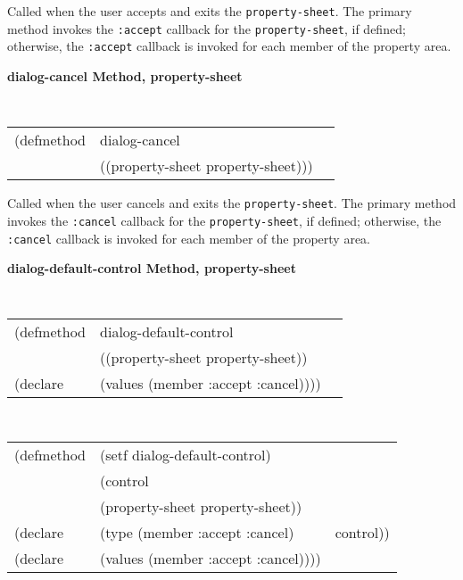 \begin{flushright} \parbox[t]{6.125in}{Called when the user accepts and exits the
{\tt property-sheet}. The primary method invokes the {\tt :accept} callback
for the {\tt property-sheet}, if defined; otherwise, the {\tt :accept} callback is invoked
for each member of the property area.  }\end{flushright}



{\samepage
{\large {\bf dialog-cancel \hfill Method, property-sheet}}
\begin{flushright} \parbox[t]{6.125in}{
\tt
\begin{tabular}{lll}
\raggedright
(defmethod & dialog-cancel & \\
& ((property-sheet  property-sheet)))
\end{tabular}
\rm

}\end{flushright}}


\begin{flushright} \parbox[t]{6.125in}{Called when the user cancels and exits the
{\tt property-sheet}. The primary method invokes the {\tt :cancel} callback
for the {\tt property-sheet}, if defined; otherwise, the {\tt :cancel} callback is invoked
for each member of the property area. }\end{flushright}

{\samepage
{\large {\bf dialog-default-control \hfill Method, property-sheet}}
\begin{flushright} \parbox[t]{6.125in}{
\tt
\begin{tabular}{lll}
\raggedright
(defmethod & dialog-default-control & \\
& ((property-sheet  property-sheet))\\
(declare &(values (member :accept :cancel))))
\end{tabular}
\rm

}\end{flushright}}

{\samepage
\begin{flushright} \parbox[t]{6.125in}{
\tt
\begin{tabular}{lll}
\raggedright
(defmethod & (setf dialog-default-control) & \\
         & (control \\
         & (property-sheet property-sheet)) \\
(declare &(type (member :accept :cancel) & control))\\
(declare &(values (member :accept :cancel))))
\end{tabular}
\rm
}
\end{flushright}}

